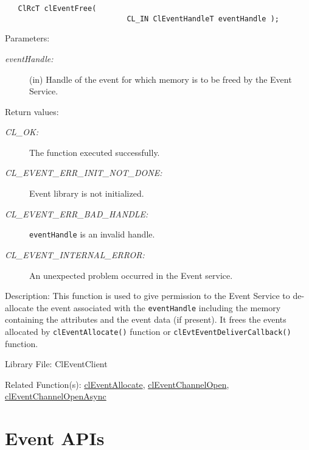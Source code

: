\begin{flushleft}
\begin{Desc}
\footnotesize\begin{verbatim}   ClRcT clEventFree(
              				CL_IN ClEventHandleT eventHandle );
\end{verbatim}
\normalsize
\end{Desc}
\begin{Desc}
\item[Parameters:]
\begin{description}
\item[{\em event\-Handle:}](in) Handle of the event for which memory is to be freed by the Event Service.\end{description}
\end{Desc}
\begin{Desc}
\item[Return values:]
\begin{description}
\item[{\em CL\_\-OK:}]The function executed successfully. 
\item[{\em CL\_\-EVENT\_\-ERR\_\-INIT\_\-NOT\_\-DONE:}]Event library is not initialized. 
\item[{\em CL\_\-EVENT\_\-ERR\_\-BAD\_\-HANDLE:}]{\tt{eventHandle}} is an invalid handle. 
\item[{\em CL\_\-EVENT\_\-INTERNAL\_\-ERROR:}]An unexpected problem occurred in the Event service.\end{description}
\end{Desc}
\begin{Desc}
\item[Description:]This function is used to give permission to the Event Service to de-allocate the event associated with the {\tt{eventHandle}} including 
the memory containing the attributes and the event data (if present). It frees the events allocated by {\tt{clEventAllocate()}} function or 
{\tt{clEvtEventDeliverCallback()}} function. 
\end{Desc}
\begin{Desc}
\item[Library File:]Cl\-Event\-Client\end{Desc}
\begin{Desc}
\item[Related Function(s):]\hyperlink{pageem107}{cl\-Event\-Allocate}, \hyperlink{pageem103}{cl\-Event\-Channel\-Open}, 
\hyperlink{pageem104}{cl\-Event\-Channel\-Open\-Async} \end{Desc}
\newpage


\section{Event APIs}

\end{flushleft}
